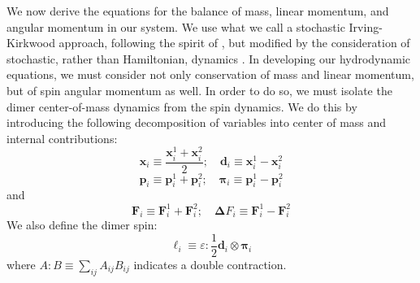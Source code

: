 \documentclass[%
 reprint,
superscriptaddress,
longbibliography,
 amsmath,amssymb,
 prl,
 citeautoscript,
]{revtex4-1}
\begin{document}
We now derive the equations for the balance of mass, linear momentum, and angular momentum in our system. We use what we call a stochastic Irving-Kirkwood approach, following the spirit of \cite{Irving+Kirkwood}, but modified by the consideration of stochastic, rather than Hamiltonian, dynamics \cite{dean, underdamped_dean}. In developing our hydrodynamic equations, we must consider not only conservation of mass and linear momentum, but of spin angular momentum as well. In order to do so, we must isolate the dimer center-of-mass dynamics from the spin dynamics. We do this by introducing the following decomposition of variables into center of mass and internal contributions:
\begin{equation}
{\boldsymbol x}_i \equiv \frac{{\boldsymbol x}_i^1 + {\boldsymbol x}_i^2}{2}; \quad {\boldsymbol d}_i \equiv {\boldsymbol x}_i^1 - {\boldsymbol x}_i^2
\label{eqn:x_decomp}
\end{equation}
\begin{equation}
{\boldsymbol p}_i \equiv {\boldsymbol p}_i^1 + {\boldsymbol p}_i^2; \quad {\boldsymbol \pi}_i \equiv {\boldsymbol p}_i^1 - {\boldsymbol p}_i^2
\label{eqn:p_decomp}
\end{equation}
and
\begin{equation}
{\boldsymbol F}_i \equiv {\boldsymbol F}_i^1 + {\boldsymbol F}_i^2; \quad {\boldsymbol \Delta F}_i \equiv {\boldsymbol F}_i^1 - {\boldsymbol F}_i^2
\label{eqn:F_decomp}
\end{equation}
We also define the dimer spin:
\begin{equation}
\ell_i \equiv \varepsilon : \frac{1}{2} {\boldsymbol d}_i \otimes {\boldsymbol \pi}_i
\label{eqn:elli_defn}
\end{equation}
where $A : B \equiv \sum_{ij} A_{ij} B_{ij}$ indicates a double contraction.
\end{document}
